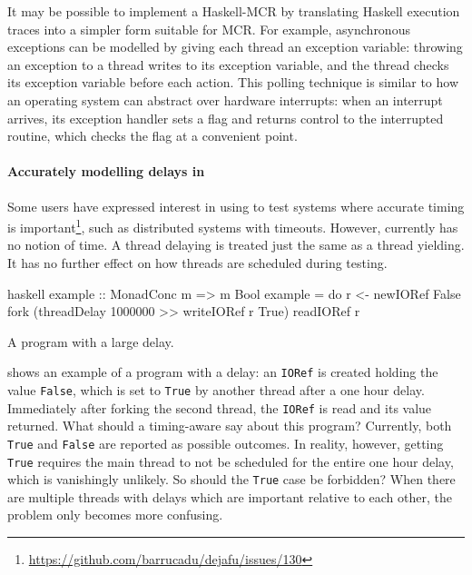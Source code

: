 It may be possible to implement a Haskell-MCR by translating Haskell
execution traces into a simpler form suitable for MCR\@.  For example,
asynchronous exceptions can be modelled by giving each thread an
exception variable: throwing an exception to a thread writes to its
exception variable, and the thread checks its exception variable
before each action.  This polling technique is similar to how an
operating system can abstract over hardware interrupts: when an
interrupt arrives, its exception handler sets a flag and returns
control to the interrupted routine, which checks the flag at a
convenient point.

\paragraph{Accurately modelling delays in \dejafu{}}
Some users have expressed interest in using \dejafu{} to test systems
where accurate timing is
important\footnote{\url{https://github.com/barrucadu/dejafu/issues/130}},
such as distributed systems with timeouts.  However, \dejafu{}
currently has no notion of time.  A thread delaying is treated just
the same as a thread yielding.  It has no further effect on how
threads are scheduled during testing.

\begin{listing}
\centering
\begin{cminted}{haskell}
example :: MonadConc m => m Bool
example = do
    r <- newIORef False
    fork (threadDelay 1000000 >> writeIORef r True)
    readIORef r
\end{cminted}
\caption{A program with a large delay.}\label{lst:unreasonable}
\end{listing}

 shows an example of a program with a delay: an
\verb|IORef| is created holding the value \verb|False|, which is set to
\verb|True| by another thread after a one hour delay.  Immediately
after forking the second thread, the \verb|IORef| is read and its value
returned.  What should a timing-aware \dejafu{} say about this
program?  Currently, both \verb|True| and \verb|False| are reported as
possible outcomes.  In reality, however, getting \verb|True| requires
the main thread to not be scheduled for the entire one hour delay,
which is vanishingly unlikely.  So should the \verb|True| case be
forbidden?  When there are multiple threads with delays which are
important relative to each other, the problem only becomes more
confusing.

